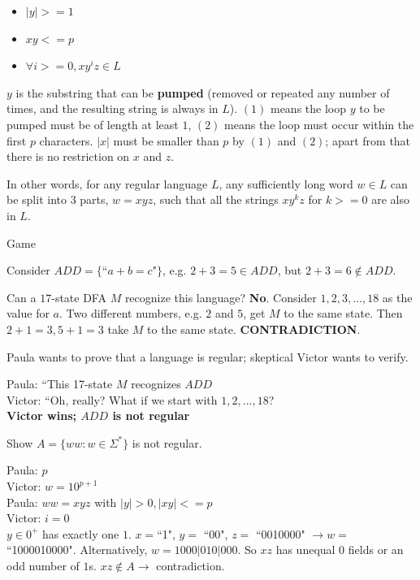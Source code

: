 \documentclass[8pt]{scrartcl}
\makeatletter
\renewcommand{\subsubsection}{\@startsection{subsubsection}{3}{0mm}
                                {-1ex plus -.5ex minus -.2ex}
                                {1ex plus .2ex}
                                {\normalfont\small\bfseries}}
\makeatother
\begin{document}
\begin{multicols}{6}
\begin{itemize}
    \item $|y| >= 1$
    \item $xy <= p$
    \item $\forall i >= 0, xy^iz \in L$
\end{itemize}

$y$ is the substring that can be {\bf pumped} (removed or repeated any number of times, and the resulting string is always in $L$). $(1)$ means the loop $y$ to be pumped must be of length at least $1$, $(2)$ means the loop must occur within the first $p$ characters. $|x|$ must be smaller than $p$ by $(1)$ and $(2)$; apart from that there is no restriction on $x$ and $z$.

In other words, for any regular language $L$, any sufficiently long word $w \in L$ can be split into $3$ parts, $w = xyz$, such that all the strings $xy^kz$ for $k >= 0$ are also in $L$.

\subsubsection{Game}

Consider $ADD = \{$``$a + b = c$"$\}$, e.g. $2 + 3 = 5 \in ADD$, but $2 + 3 = 6 \notin ADD$.

Can a $17$-state DFA $M$ recognize this language? {\bf No}. Consider $1, 2, 3, ..., 18$ as the value for $a$. Two different numbers, e.g. $2$ and $5$, get $M$ to the same state. Then $2 + 1 = 3, 5 + 1 = 3$ take $M$ to the same state. {\bf CONTRADICTION}.

Paula wants to prove that a language is regular; skeptical Victor wants to verify.

Paula: ``This 17-state $M$ recognizes $ADD$\\
Victor: ``Oh, really? What if we start with $1, 2, ..., 18$?\\
{\bf Victor wins; $ADD$ is not regular}

\hline

Show $A = \{ww: w \in \Sigma^*\}$ is not regular.

Paula: $p$\\
Victor: $w = 10^{p+1}$\\
Paula: $ww = xyz$ with $|y| > 0, |xy| <= p$\\
Victor: $i = 0$\\
$y \in 0^+$ has exactly one $1$. $x = $``1", $y =$ ``00", $z =$ ``0010000" $\rightarrow w =$ ``1000010000". Alternatively, $w = 1000|010|000$. So $xz$ has unequal $0$ fields or an odd number of $1$s. $xz \notin A \rightarrow$ contradiction.


\end{multicols}
\end{document}
